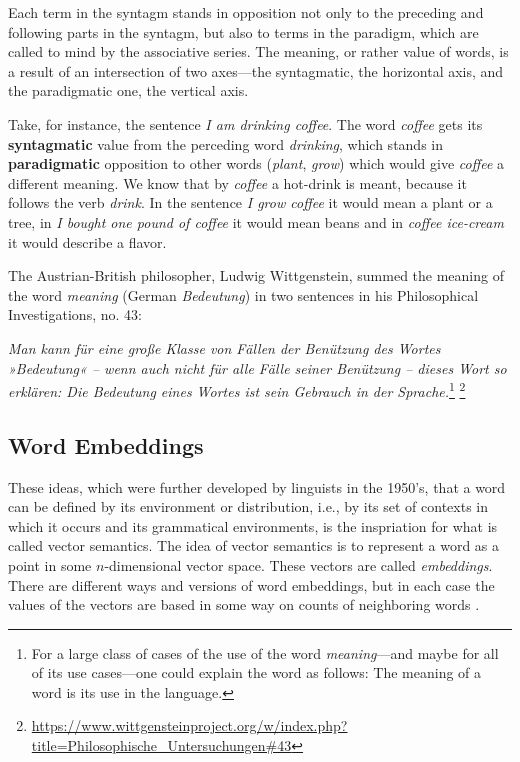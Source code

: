 Each term in the syntagm stands in opposition not only to the preceding and following parts in the syntagm, but also to terms in the paradigm, which are called to mind by the associative series. 
The meaning, or rather value of words, is a result of an intersection of two axes---the syntagmatic, the horizontal axis, and the paradigmatic one, the vertical axis.

Take, for instance, the sentence \emph{I am drinking coffee}. The word \emph{coffee} gets its  \textbf{syntagmatic} value from the perceding word \emph{drinking}, which stands in \textbf{paradigmatic} opposition to other words (\emph{plant}, \emph{grow}) which would give \emph{coffee} a different meaning.
We know that by \emph{coffee} a hot-drink is meant, because it follows the verb \emph{drink}. In the sentence \emph{I grow coffee} it would mean a plant or a tree, in \emph{I bought one pound of coffee} it would mean beans and in \emph{coffee ice-cream} it would describe a flavor.

The Austrian-British philosopher, Ludwig Wittgenstein, summed the meaning of the word \emph{meaning} (German \emph{Bedeutung}) in two sentences in his Philosophical Investigations, no. 43:


\begin{displayquote}\emph{
Man kann für eine große Klasse von Fällen der Benützung des Wortes »Bedeutung« – wenn auch nicht für alle Fälle seiner Benützung – dieses Wort so erklären: Die Bedeutung eines Wortes ist sein Gebrauch in der Sprache.}\footnote{{For a large class of cases of the use of the word \emph{meaning}---and maybe for all of its use cases---one could explain the word as follows: The meaning of a word is its use in the language.}} \footnote{\url{https://www.wittgensteinproject.org/w/index.php?title=Philosophische_Untersuchungen\#43}}
\end{displayquote}

\subsection{Word Embeddings}
These ideas, which were further developed by linguists in the 1950's, that a word can be defined by its environment or distribution, i.e., by its set of contexts in which it occurs and its grammatical environments, is the inspriation for what is called vector semantics.  
The idea of vector semantics is to represent a word as a point in some $n$-dimensional vector space. 
These vectors are called \emph{embeddings}. 
There are different ways and versions of word embeddings, but in each case the values of the vectors are based in some way on counts of neighboring words \autocite[98-99]{jurafsky-2019}.

